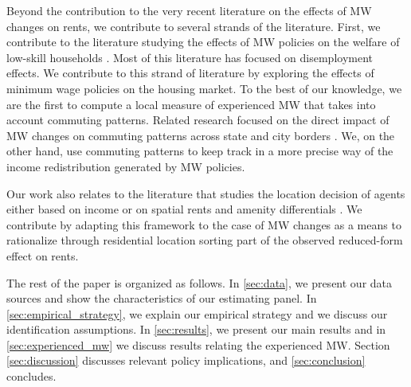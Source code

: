 Beyond the contribution to the very recent literature on the effects of MW changes on rents, 
we contribute to several strands of the literature. First, we contribute to the literature 
studying the effects of MW policies on the welfare of low-skill households \parencite[][among 
others]{DinardoEtAl1995, Lee1999, CardKrueger2000, Neumark2006, AutorEtAl2016, CegnizEtAl2019}. 
Most of this literature has focused on disemployment effects. We contribute to this strand of 
literature by exploring the effects of minimum wage policies on the housing market. To the best 
of our knowledge, we are the first to compute a local measure of experienced MW that takes into 
account commuting patterns. Related research focused on the direct impact of MW changes on 
commuting patterns across state and city borders \parencite{Mckinnish2017, PerezPerez2018}. 
We, on the other hand, use commuting patterns to keep track in a more precise way of the 
income redistribution generated by MW policies.

Our work also relates to the literature that studies the location decision of agents either 
based on income \parencite{Roback1982, Kennan2011, DesmetRossihansberg2013, PerezPerez2018, 
Monras2019} or on spatial rents and amenity differentials \parencite{Diamond2016, 
AlmagroDominguez2019, Couture2019}. We contribute by adapting this framework to the case of 
MW changes as a means to rationalize through residential location sorting part of the
observed reduced-form effect on rents.

The rest of the paper is organized as follows. In \autoref{sec:data}, we present our data 
sources and show the characteristics of our estimating panel. In 
\autoref{sec:empirical_strategy}, we explain our empirical strategy and we discuss our 
identification assumptions. In \autoref{sec:results}, we present our main results and in 
\ref{sec:experienced_mw} we discuss results relating the experienced MW. Section 
\ref{sec:discussion} discusses relevant policy implications, and \autoref{sec:conclusion} 
concludes.
